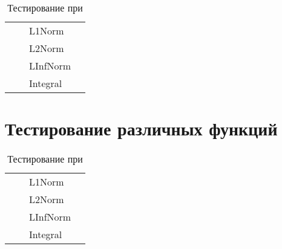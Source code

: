 \begin{table}
	\caption{Тестирование при }
	\centering
	\small
	\begin{tabularx}{1.0\textwidth}{| >{\raggedright\arraybackslash}X | >{\raggedright\arraybackslash}X | >{\raggedright\arraybackslash}X | >{\raggedright\arraybackslash}X |}
		\hline
		\centering{Входные точки}  & \centering{Функция} & \centering{Функционал} & \centering{Результат} \tabularnewline \hline    
		
		\multirow{4}{*}{\centering{(0.5; 0.5; 0.5)}} & \multirow{4}{*}{\centering{FFFFF}} & L1Norm & \centering{0.00000000E+000; 0.00000000E+000; 0.00000000E+000} \tabularnewline \cline{3-4}
		& & L2Norm & \centering{0.00000000E+000; 0.00000000E+000; 0.00000000E+000} \tabularnewline \cline{3-4}
		& & LInfNorm & \centering{0.00000000E+000; 0.00000000E+000; 0.00000000E+000} \tabularnewline \cline{3-4}
		& & Integral & \centering{0.00000000E+000; 0.00000000E+000; 0.00000000E+000} \tabularnewline \hline
	\end{tabularx}
	\label{tab:test5}
\end{table}

\section{Тестирование различных функций}

\begin{table}
	\caption{Тестирование при }
	\centering
	\small
	\begin{tabularx}{1.0\textwidth}{| >{\raggedright\arraybackslash}X | >{\raggedright\arraybackslash}X | >{\raggedright\arraybackslash}X | >{\raggedright\arraybackslash}X |}
		\hline
		\centering{Входные точки}  & \centering{Функция} & \centering{Функционал} & \centering{Результат} \tabularnewline \hline    
		
		\multirow{4}{*}{\centering{(0.5; 0.5; 0.5)}} & \multirow{4}{*}{\centering{FFFFF}} & L1Norm & \centering{0.00000000E+000; 0.00000000E+000; 0.00000000E+000} \tabularnewline \cline{3-4}
		& & L2Norm & \centering{0.00000000E+000; 0.00000000E+000; 0.00000000E+000} \tabularnewline \cline{3-4}
		& & LInfNorm & \centering{0.00000000E+000; 0.00000000E+000; 0.00000000E+000} \tabularnewline \cline{3-4}
		& & Integral & \centering{0.00000000E+000; 0.00000000E+000; 0.00000000E+000} \tabularnewline \hline
	\end{tabularx}
	\label{tab:test6}
\end{table}

